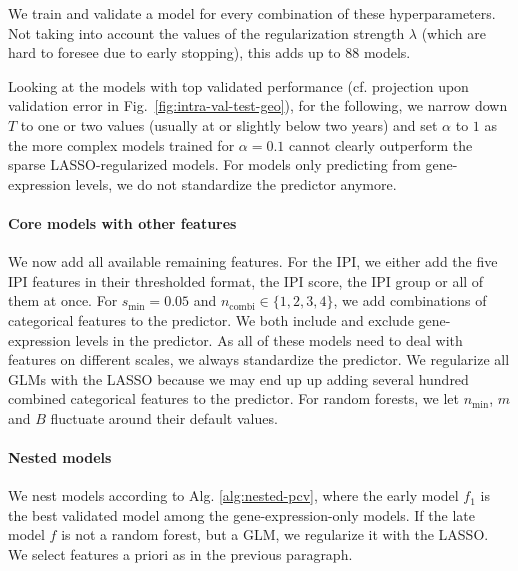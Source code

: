 We train and validate a model for every combination of these hyperparameters.
Not taking into account the values of the regularization strength $\lambda$ (which are hard to 
foresee due to early stopping), this adds up to \num{88} models.

Looking at the models with top validated performance (cf. projection upon validation error in Fig.\
\ref{fig:intra-val-test-geo}), for the following, we narrow down $T$ to one or 
two values (usually at or slightly below two years) and set $\alpha$ to $1$ as the more complex models 
trained for $\alpha = \num{0.1}$ cannot clearly outperform the sparse LASSO-regularized models. For 
models only predicting from gene-expression levels, we do not standardize the predictor anymore.

\paragraph{Core models with other features}
We now add all available remaining features. For the 
IPI, we either add the five IPI features in their thresholded format, the IPI score, the IPI group
or all of them at once. For $s_\text{min} = \num{0.05}$ 
and $n_\text{combi} \in \{1, 2, 3, 4 \}$, we add combinations of categorical features to the 
predictor. 
We both include and exclude gene-expression levels in the predictor.
As all of these models need to deal with features on different scales, we always 
standardize the predictor. We regularize all GLMs with the LASSO because we may end up up adding 
several hundred combined categorical features to the predictor. For random forests, we let 
$n_\text{min}$, $m$ and $B$ fluctuate around their default values.

\paragraph{Nested models}
We nest models according to Alg. \ref{alg:nested-pcv}, where the early model $f_1$ is the best 
validated model among the gene-expression-only models. If the late model $f$ is not a random 
forest, but a GLM, we regularize it with the LASSO. We select features a priori as in the previous 
paragraph.

